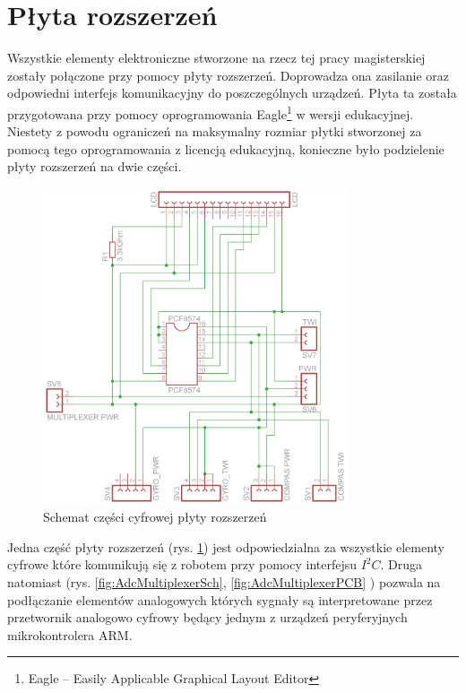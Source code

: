 \section{Płyta rozszerzeń}
\label{ch:ExpanderChapter}
Wszystkie elementy elektroniczne stworzone na rzecz tej pracy magisterskiej
zostały połączone przy pomocy płyty rozszerzeń. Doprowadza ona zasilanie oraz
odpowiedni interfejs komunikacyjny do poszczególnych urządzeń. Płyta ta została
przygotowana przy pomocy oprogramowania Eagle\footnote{Eagle -- Easily Applicable
Graphical Layout Editor} w wersji edukacyjnej. Niestety z powodu ograniczeń na
maksymalny rozmiar płytki stworzonej za pomocą tego oprogramowania z licencją
edukacyjną, konieczne było podzielenie płyty rozszerzeń na dwie części.

\begin{figure}[!ht]
 \centering
 \includegraphics[width=0.8\textwidth]{../images/ch04/extension_board-sch.png}
 \caption{Schemat części cyfrowej płyty rozszerzeń}
 \label{fig:ExtBoardSch}
\end{figure}

Jedna część płyty rozszerzeń (rys. \ref{fig:ExtBoardSch}) jest odpowiedzialna za
wszystkie elementy cyfrowe które komunikują się z robotem przy pomocy interfejsu
$I^{2}C$. Druga natomiast (rys. \ref{fig:AdcMultiplexerSch},
\ref{fig:AdcMultiplexerPCB} ) pozwala na podłączanie elementów analogowych których sygnały są interpretowane przez
przetwornik analogowo cyfrowy będący jednym z urządzeń peryferyjnych
mikrokontrolera ARM.
\newpage

